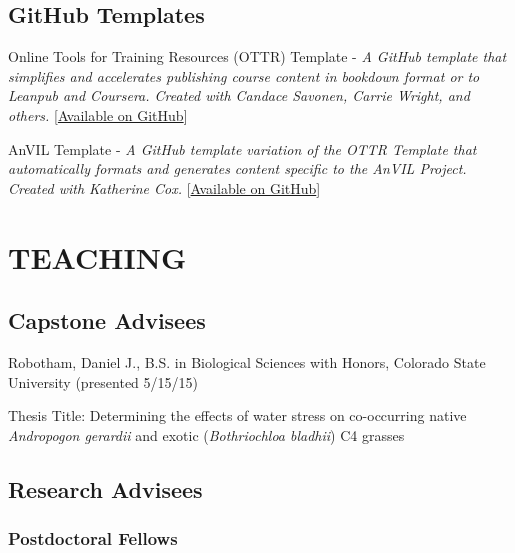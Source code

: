 \documentclass{cv}
\begin{document}
\subsection*{GitHub Templates}

Online Tools for Training Resources (OTTR) Template - \textit{A GitHub template that simplifies and accelerates publishing course content in bookdown format or to Leanpub and Coursera. Created with Candace Savonen, Carrie Wright, and others.} [\href{https://github.com/jhudsl/OTTR_Template}{Available on GitHub}]

AnVIL Template - \textit{A GitHub template variation of the OTTR Template that automatically formats and generates content specific to the AnVIL Project. Created with Katherine Cox.} [\href{https://github.com/jhudsl/AnVIL_Template}{Available on GitHub}]



\newpage
{}
\parttwo



\section*{TEACHING}


\subsection*{Capstone Advisees}

Robotham, Daniel J., B.S. in Biological Sciences with Honors, Colorado State University (presented 5/15/15)

Thesis Title: Determining the effects of water stress on co-occurring native \textit{Andropogon gerardii} and exotic (\textit{Bothriochloa bladhii}) C4 grasses

\subsection*{Research Advisees}

\subsubsection*{Postdoctoral Fellows}
\end{document}
